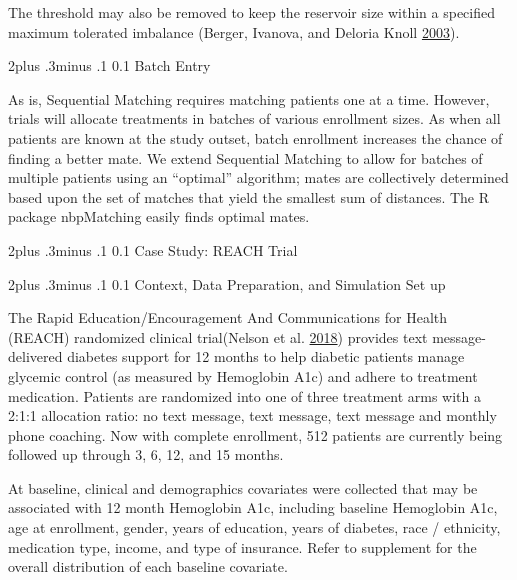 \documentclass[12pt,oneside]{book}
\makeatletter
\newlength{\li}\setlength{\li}{14.48pt}
\newlength{\di}\setlength{\di}{-3.5mm}
\renewcommand\section{ \@startsection {section}{1}{\z@}%
    {2\@bls  plus .3\@bls minus .1\@bls}%
    {0.1\@bls}%
    {\centering\normalfont}}
\renewcommand\subsection{\@startsection {subsection}{2}{\z@}%
    {2\@bls  plus .3\@bls minus .1\@bls}%
    {0.1\@bls}%
    {\noindent\normalfont}}
\theoremstyle{definition}
\theoremstyle{definition}
\theoremstyle{definition}
\theoremstyle{remark}
\makeatother
\begin{document}
The threshold may also be removed to keep the reservoir size within a
specified maximum tolerated imbalance (Berger, Ivanova, and Deloria
Knoll \protect\hyperlink{ref-Berger:2003im}{2003}).

\hypertarget{batch-entry}{%
\section{Batch Entry}\label{batch-entry}}

As is, Sequential Matching requires matching patients one at a time.
However, trials will allocate treatments in batches of various
enrollment sizes. As when all patients are known at the study outset,
batch enrollment increases the chance of finding a better mate. We
extend Sequential Matching to allow for batches of multiple patients
using an ``optimal'' algorithm; mates are collectively determined based
upon the set of matches that yield the smallest sum of distances. The R
package nbpMatching easily finds optimal mates.

\hypertarget{case-study-reach-trial}{%
\section{Case Study: REACH Trial}\label{case-study-reach-trial}}

\hypertarget{context-data-preparation-and-simulation-set-up}{%
\subsection{Context, Data Preparation, and Simulation Set
up}\label{context-data-preparation-and-simulation-set-up}}

The Rapid Education/Encouragement And Communications for Health (REACH)
randomized clinical trial(Nelson et al.
\protect\hyperlink{ref-Nelson:2018bw}{2018}) provides text
message-delivered diabetes support for 12 months to help diabetic
patients manage glycemic control (as measured by Hemoglobin A1c) and
adhere to treatment medication. Patients are randomized into one of
three treatment arms with a 2:1:1 allocation ratio: no text message,
text message, text message and monthly phone coaching. Now with complete
enrollment, 512 patients are currently being followed up through 3, 6,
12, and 15 months.

At baseline, clinical and demographics covariates were collected that
may be associated with 12 month Hemoglobin A1c, including baseline
Hemoglobin A1c, age at enrollment, gender, years of education, years of
diabetes, race / ethnicity, medication type, income, and type of
insurance. Refer to supplement for the overall distribution of each
baseline covariate.
\end{document}
